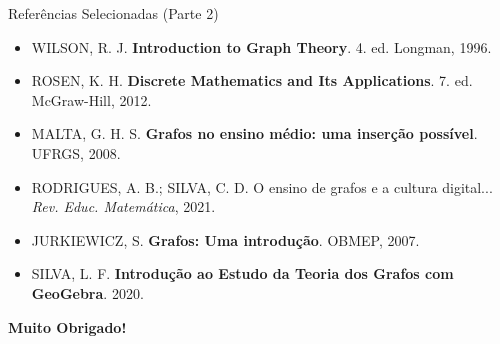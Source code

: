\documentclass[10pt]{beamer}
\begin{document}
\begin{frame}{Referências Selecionadas (Parte 2)}
\transdissolve 
\footnotesize
\begin{itemize}
    \setlength{\itemsep}{0.35cm}
    \item WILSON, R. J. \textbf{Introduction to Graph Theory}. 4. ed. Longman, 1996.
    \item ROSEN, K. H. \textbf{Discrete Mathematics and Its Applications}. 7. ed. McGraw-Hill, 2012.
    \item MALTA, G. H. S. \textbf{Grafos no ensino médio: uma inserção possível}. UFRGS, 2008.
    \item RODRIGUES, A. B.; SILVA, C. D. O ensino de grafos e a cultura digital... \textit{Rev. Educ. Matemática}, 2021.
    \item JURKIEWICZ, S. \textbf{Grafos: Uma introdução}. OBMEP, 2007.
    \item SILVA, L. F. \textbf{Introdução ao Estudo da Teoria dos Grafos com GeoGebra}. 2020.
\end{itemize}
\end{frame}

\begin{frame}[plain]
\transglitter 
\begin{center}
\vspace{1.5cm}
{\Huge \textbf{Muito Obrigado!}}

\end{center}
\end{frame}
\end{document}
